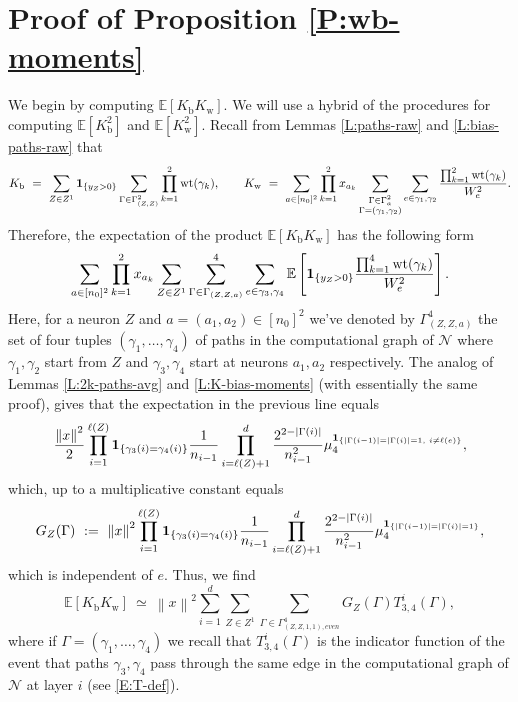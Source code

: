 \documentclass[11pt, reqno]{amsart}
\newcommand{\E}[1]{{\mathbb E}\left [#1\right]}
\newcommand{\abs}[1]{\ensuremath{\left| #1 \right|}}
\newcommand{\lr}[1]{\ensuremath{\left(#1 \right)}}
\newcommand{\norm}[1]{\left\lVert#1\right\rVert}
\newcommand{\set}[1]{\ensuremath{\{#1\}}}
\newcommand{\mN}{\mathcal N}
\newcommand{\Kw}{K_{\mathrm{w}}}
\newcommand{\Kb}{K_{\mathrm{b}}}
\DeclareMathOperator{\wt}{wt}
\begin{document}
\section{Proof of Proposition \ref{P:wb-moments}}\label{S:wb-moments-pf}
\noindent We begin by computing $\E{\Kb\Kw}$. We will use a hybrid of the procedures for computing $\E{\Kb^2}$ and $\E{\Kw^2}.$ Recall from Lemmas \ref{L:paths-raw} and \ref{L:bias-paths-raw} that
\[\Kb~=~\sum_{Z\in Z^1} {\bf 1}_{\set{y_Z>0}} \sum_{\Gamma\in \Gamma_{(Z,Z)}^2} \prod_{k=1}^2 \wt(\gamma_k),\qquad \Kw~=~\sum_{a\in [n_0]^2}\prod_{k=1}^2x_{a_k} \sum_{\substack{\Gamma\in \Gamma_a^2\\\Gamma = \lr{\gamma_1,\gamma_2}}}\sum_{e\in\gamma_1,\gamma_2} \frac{\prod_{k=1}^2 \wt(\gamma_k)}{W_e^2}.\]
Therefore, the expectation of the product $\E{\Kb\Kw}$ has the following form 
\[\sum_{a\in [n_0]^2}\prod_{k=1}^2 x_{a_k} \sum_{Z\in Z^1} \sum_{\Gamma\in \Gamma_{(Z,Z,a)}}^4\sum_{e\in \gamma_3,\gamma_4} \E{{\bf 1}_{\set{y_Z>0}} \frac{\prod_{k=1}^4 \wt(\gamma_k)}{W_e^2}}.\]
Here, for a neuron $Z$ and $a=(a_1,a_2)\in [n_0]^2$ we've denoted by $\Gamma_{(Z,Z,a)}^4$ the set of four tuples $(\gamma_1,\ldots, \gamma_4)$ of paths in the computational graph of $\mN$ where $\gamma_1,\gamma_2$ start from $Z$ and $\gamma_3,\gamma_4$ start at neurons $a_1,a_2$ respectively. The analog of Lemmas \ref{L:2k-paths-avg} and \ref{L:K-bias-moments} (with essentially the same proof), gives that the expectation in the previous line equals
\[\frac{\norm{x}^2}{2}\prod_{i=1}^{\ell(Z)} {\bf 1}_{\set{\gamma_3(i)=\gamma_4(i)}}\frac{1}{n_{i-1}}\prod_{i=\ell(Z)+1}^{d}\frac{2^{2-\abs{\Gamma(i)}}}{n_{i-1}^2} \mu_4^{{\bf 1}_{\set{\abs{\Gamma(i-1)}=\abs{\Gamma(i)}=1,\,\, i\neq \ell(e)}}},\]
which, up to a multiplicative constant equals
\begin{equation}\label{E:G-def}
G_Z(\Gamma)~:=~\norm{x}^2\prod_{i=1}^{\ell(Z)} {\bf 1}_{\set{\gamma_3(i)=\gamma_4(i)}}\frac{1}{n_{i-1}}\prod_{i=\ell(Z)+1}^{d}\frac{2^{2-\abs{\Gamma(i)}}}{n_{i-1}^2} \mu_4^{{\bf 1}_{\set{\abs{\Gamma(i-1)}=\abs{\Gamma(i)}=1}}},
\end{equation}
which is independent of $e.$ Thus, we find
\[\E{\Kb\Kw}~\simeq~\norm{x}^2\sum_{i=1}^d\sum_{Z\in Z^1} \sum_{\Gamma\in \Gamma_{(Z,Z,1,1),{even}}^4}G_Z(\Gamma)T_{3,4}^{i}(\Gamma),\]
where if $\Gamma=\lr{\gamma_1,\ldots, \gamma_4}$ we recall that $T_{3,4}^i(\Gamma)$ is the indicator function of the event that paths $\gamma_3,\gamma_4$ pass through the same edge in the computational graph of $\mN$ at layer $i$ (see \eqref{E:T-def}).
\end{document}
